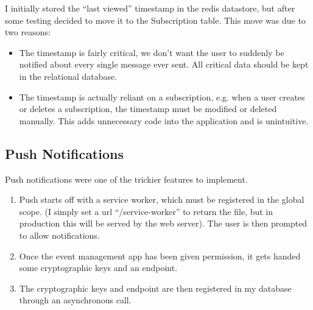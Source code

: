 \documentclass[a4paper,oneside,12pt]{report}
\begin{document}
	\begin{center}
	\end{center}

	I initially stored the “last viewed” timestamp in the redis datastore, but after some testing decided to move it to the Subscription table. This move was due to two reasons:
	\begin{itemize}
		\item The timestamp is fairly critical, we don't want the user to suddenly be notified about every single message ever sent. All critical data should be kept in the relational database.
		\item The timestamp is actually reliant on a subscription, e.g. when a user creates or deletes a subscription, the timestamp must be modified or deleted manually. This adds unnecessary code into the application and is unintuitive.
	\end{itemize}

	\subsection{Push Notifications}
	Push notifications were one of the trickier features to implement.
	
	\begin{enumerate}
		\item Push starts off with a service worker, which must be registered in the global scope. (I simply set a url “/service-worker” to return the file, but in production this will be served by the web server). The user is then prompted to allow notifications.
		\item Once the event management app has been given permission, it gets handed some cryptographic keys and an endpoint.
		\item The cryptographic keys and endpoint are then registered in my database through an asynchronous call.
	\end{enumerate}
	
\end{document}

